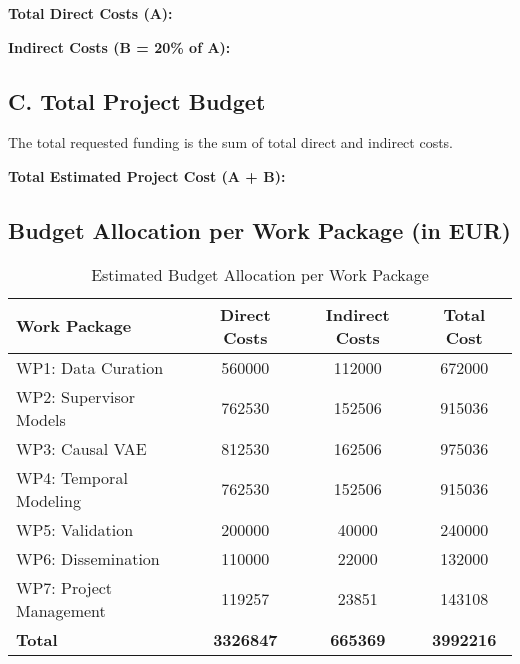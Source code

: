 \textbf{Total Direct Costs (A): }

\textbf{Indirect Costs (B = 20\% of A): }

\subsection*{C. Total Project Budget}
The total requested funding is the sum of total direct and indirect costs.

\textbf{Total Estimated Project Cost (A + B):} 

\subsection*{Budget Allocation per Work Package (in EUR)}

\begin{table}[H]
\centering
\caption{Estimated Budget Allocation per Work Package}
\label{tab:budget_wp}
\begin{tabular}{lS[table-format=7.0]S[table-format=7.0]S[table-format=7.0]}
\toprule
\textbf{Work Package} & {\textbf{Direct Costs}} & {\textbf{Indirect Costs}} & {\textbf{Total Cost}} \\
\midrule
WP1: Data Curation & 560000 & 112000 & 672000 \\
WP2: Supervisor Models & 762530 & 152506 & 915036 \\
WP3: Causal VAE & 812530 & 162506 & 975036 \\
WP4: Temporal Modeling & 762530 & 152506 & 915036 \\
WP5: Validation & 200000 & 40000 & 240000 \\
WP6: Dissemination & 110000 & 22000 & 132000 \\
WP7: Project Management & 119257 & 23851 & 143108 \\
\midrule
\textbf{Total} & {\textbf{3326847}} & {\textbf{665369}} & {\textbf{3992216}} \\
\bottomrule
\end{tabular}
\end{table}